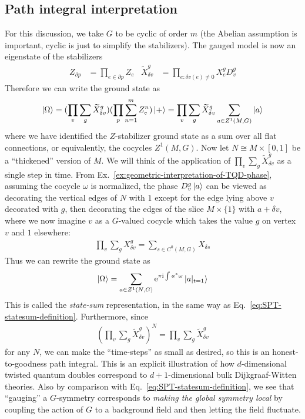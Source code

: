 \documentclass{article}
\theoremstyle{definition}
\theoremstyle{definition}
\newcommand{\e}{\mathrm{e}}
\newcommand{\ii}{\mathrm{i}}
\begin{document}
\subsection{Path integral interpretation}
For this discussion, we take $G$ to be cyclic of order $m$ (the Abelian
assumption is important, cyclic is just to simplify the stabilizers).
The gauged model is now an eigenstate of the stabilizers
\begin{align}\label{eq:homological-stabilizer-formulas}
  Z_{\partial p} &= \prod_{e \in \partial p}Z_e
  &
    \widetilde X_{\delta v}^g &= \prod_{e:\delta v(e) \neq
  0}X^{g}_{e}D_{v}^g
\end{align}
  Therefore we can write the ground state as
\begin{align}\label{eq:TQD-ground-state-expression}
  \ket{\Omega} = (\prod_v \sum_{g}\widetilde X_{\delta v}^g)(\prod_p \sum_{n = 1}^mZ_e^n)\ket{+} = 
  \prod_v \sum_{g}\widetilde X_{\delta v}^g\sum_{a \in Z^1(M, G)}\ket{a}
\end{align}
where we have identified the $Z$-stabilizer ground state as a sum over all flat
connections, or equivalently, the cocycles $Z^1(M, G)$. Now let $N \cong M
\times [0,1]$ be a
``thickened'' version of $M$. We will think of the application of $\prod_v
\sum_g \widetilde X^g_{\delta v}$ as a single step in time. From
Ex.~\ref{ex:geometric-interpretation-of-TQD-phase}, assuming the cocycle
$\omega$ is normalized, the phase $D_{v}^g\ket{a}$ can be viewed as decorating
the vertical edges of $N$ with $1$ except for the edge lying above $v$ decorated
with $g$, then decorating the edges of the slice $M \times \{1\}$ with $a +
\delta v$, where we now imagine $v$ as a $G$-valued cocycle which takes the
value $g$ on vertex $v$ and $1$ elsewhere:
\begin{align}
  \prod_v \sum_gX_{\delta v}^g = \sum_{s \in C^0(M, G)}X_{\delta s}
\end{align}
Thus we can rewrite the ground state as
\begin{align}\label{eq:TQD-statesum-representation}
\ket{\Omega} = \sum_{a \in Z^1(N, G)}\e^{\pi \ii\int a^* \omega}\ket{a|_{t = 1}}
\end{align}
This is called the \textit{state-sum} representation, in the same way as
Eq.~\eqref{eq:SPT-statesum-definition}. Furthermore, since
\begin{align}
(\prod_v \sum_g \widetilde X_{\delta v}^g)^N = \prod_v \sum_g \widetilde X_{\delta v}^g
\end{align}
for any $N$, we can make the ``time-steps'' as small as desired, so this is an
honest-to-goodness path integral. This is an explicit illustration of how
$d$-dimensional twisted quantum doubles correspond to $d+1$-dimensional
bulk Dijkgraaf-Witten theories. Also by comparison with
Eq.~\eqref{eq:SPT-statesum-definition}, we see that ``gauging'' a $G$-symmetry
corresponds to \textit{making the global symmetry local} by coupling the action
of $G$ to a background field and then letting the field fluctuate.
\end{document}
